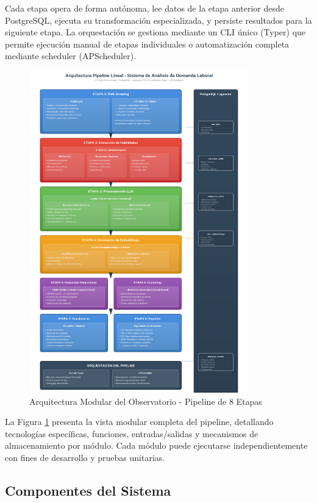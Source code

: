 Cada etapa opera de forma autónoma, lee datos de la etapa anterior desde PostgreSQL, ejecuta su transformación especializada, y persiste resultados para la siguiente etapa. La orquestación se gestiona mediante un CLI único (Typer) que permite ejecución manual de etapas individuales o automatización completa mediante scheduler (APScheduler).

\begin{figure}[H]
\centering
\includegraphics[width=0.85\textwidth]{diagrams/pipeline_arquitectura.png}
\caption{Arquitectura Modular del Observatorio - Pipeline de 8 Etapas}
\label{fig:arquitectura-completa}
\end{figure}

La Figura \ref{fig:arquitectura-completa} presenta la vista modular completa del pipeline, detallando tecnologías específicas, funciones, entradas/salidas y mecanismos de almacenamiento por módulo. Cada módulo puede ejecutarse independientemente con fines de desarrollo y pruebas unitarias.

\subsection{Componentes del Sistema}


